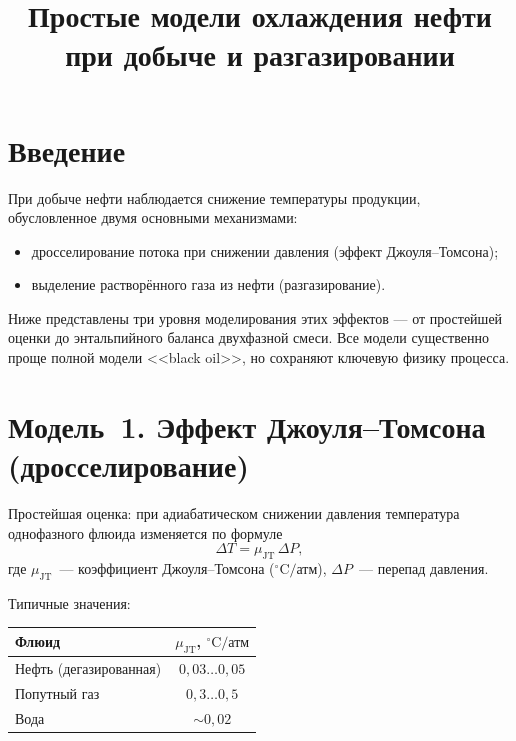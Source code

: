 \documentclass[12pt,a4paper]{article}
\title{Простые модели охлаждения нефти при добыче и разгазировании}
\author{}
\date{}
\begin{document}
\maketitle

\section{Введение}

При добыче нефти наблюдается снижение температуры продукции, обусловленное
двумя основными механизмами:
\begin{itemize}[nosep]
  \item дросселирование потока при снижении давления (эффект Джоуля--Томсона);
  \item выделение растворённого газа из нефти (разгазирование).
\end{itemize}

Ниже представлены три уровня моделирования этих эффектов --- от простейшей
оценки до энтальпийного баланса двухфазной смеси. Все модели существенно
проще полной модели <<black oil>>, но сохраняют ключевую физику процесса.

\section{Модель~1. Эффект Джоуля--Томсона (дросселирование)}

Простейшая оценка: при адиабатическом снижении давления температура
однофазного флюида изменяется по формуле
\begin{equation}\label{eq:JT}
  \Delta T = \mu_{\mathrm{JT}}\,\Delta P,
\end{equation}
где $\mu_{\mathrm{JT}}$~--- коэффициент Джоуля--Томсона
(${}^\circ\mathrm{C}/\text{атм}$), $\Delta P$~--- перепад давления.

Типичные значения:
\begin{center}
\begin{tabular}{lc}
  \hline
  Флюид & $\mu_{\mathrm{JT}}$, ${}^\circ\mathrm{C}/\text{атм}$ \\
  \hline
  Нефть (дегазированная) & $0{,}03 \ldots 0{,}05$ \\
  Попутный газ           & $0{,}3  \ldots 0{,}5$  \\
  Вода                   & $\sim 0{,}02$           \\
  \hline
\end{tabular}
\end{center}
\end{document}
